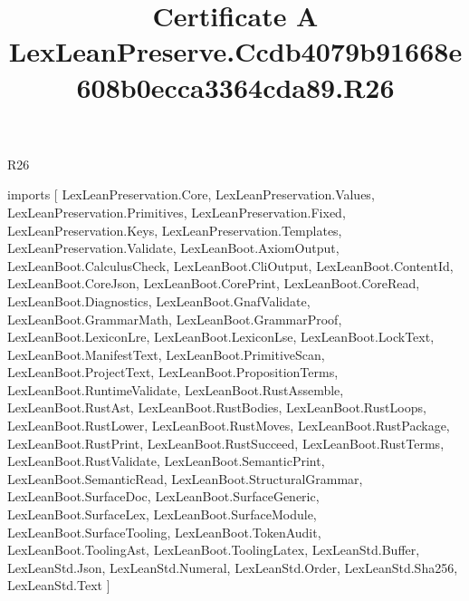 \begin{lexlean}{R26}
\title{Certificate A LexLeanPreserve.Ccdb4079b91668e608b0ecca3364cda89.R26}
\begin{coremodule}
imports [
  LexLeanPreservation.Core,
  LexLeanPreservation.Values,
  LexLeanPreservation.Primitives,
  LexLeanPreservation.Fixed,
  LexLeanPreservation.Keys,
  LexLeanPreservation.Templates,
  LexLeanPreservation.Validate,
  LexLeanBoot.AxiomOutput,
  LexLeanBoot.CalculusCheck,
  LexLeanBoot.CliOutput,
  LexLeanBoot.ContentId,
  LexLeanBoot.CoreJson,
  LexLeanBoot.CorePrint,
  LexLeanBoot.CoreRead,
  LexLeanBoot.Diagnostics,
  LexLeanBoot.GnafValidate,
  LexLeanBoot.GrammarMath,
  LexLeanBoot.GrammarProof,
  LexLeanBoot.LexiconLre,
  LexLeanBoot.LexiconLse,
  LexLeanBoot.LockText,
  LexLeanBoot.ManifestText,
  LexLeanBoot.PrimitiveScan,
  LexLeanBoot.ProjectText,
  LexLeanBoot.PropositionTerms,
  LexLeanBoot.RuntimeValidate,
  LexLeanBoot.RustAssemble,
  LexLeanBoot.RustAst,
  LexLeanBoot.RustBodies,
  LexLeanBoot.RustLoops,
  LexLeanBoot.RustLower,
  LexLeanBoot.RustMoves,
  LexLeanBoot.RustPackage,
  LexLeanBoot.RustPrint,
  LexLeanBoot.RustSucceed,
  LexLeanBoot.RustTerms,
  LexLeanBoot.RustValidate,
  LexLeanBoot.SemanticPrint,
  LexLeanBoot.SemanticRead,
  LexLeanBoot.StructuralGrammar,
  LexLeanBoot.SurfaceDoc,
  LexLeanBoot.SurfaceGeneric,
  LexLeanBoot.SurfaceLex,
  LexLeanBoot.SurfaceModule,
  LexLeanBoot.SurfaceTooling,
  LexLeanBoot.TokenAudit,
  LexLeanBoot.ToolingAst,
  LexLeanBoot.ToolingLatex,
  LexLeanStd.Buffer,
  LexLeanStd.Json,
  LexLeanStd.Numeral,
  LexLeanStd.Order,
  LexLeanStd.Sha256,
  LexLeanStd.Text
]


\end{coremodule}
\end{lexlean}
